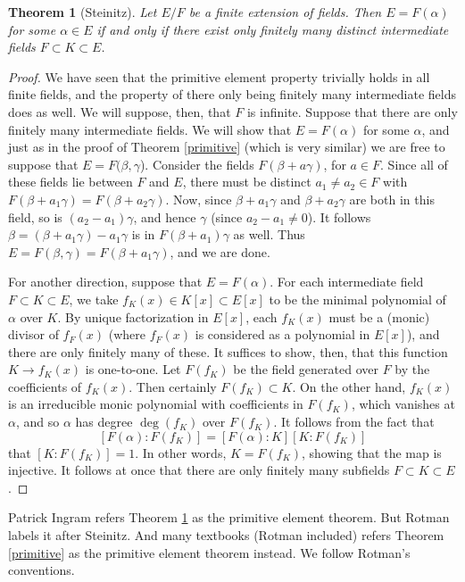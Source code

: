 \documentclass[12pt]{report}
\newtheorem{theorem}{Theorem}[section]
\theoremstyle{definition}
\begin{document}
\begin{theorem}[Steinitz]\label{ste}
	Let $E/F$ be a finite extension of fields. Then $E = F(\alpha)$ for some $\alpha \in E$ if and only if there exist only finitely many distinct intermediate fields $F \subset K \subset E$.
\end{theorem}

\begin{proof}
	We have seen that the primitive element property trivially holds in all finite fields, and the property of there only being finitely many intermediate fields does as well. We will suppose, then, that $F$ is infinite.
	Suppose that there are only finitely many intermediate fields. We will show that $E = F(\alpha)$ for some $\alpha$, and just as in the proof of Theorem \ref{primitive} (which is very similar) we are free to suppose that $E = F(\beta,\gamma$). Consider the fields $F(\beta + a\gamma)$, for $a \in F$. Since all of these fields lie between $F$ and $E$, there must be distinct $a_1 \not= a_2 \in F$ with $F(\beta + a_1 \gamma) = F(\beta + a_2\gamma)$. Now, since $\beta + a_1 \gamma$ and $\beta + a_2 \gamma$ are both in this field, so is $(a_2 - a_1)\gamma$, and hence $\gamma$ (since $a_2 - a_1 \not= 0$). It follows $\beta = (\beta+a_1\gamma) -a_1\gamma$ is in $F(\beta +a_1)\gamma$ as well. Thus $E = F(\beta,\gamma) = F(\beta + a_1\gamma)$, and we are done.

	For another direction, suppose that $E = F(\alpha)$. For each intermediate field $F \subset K \subset E$, we take $f_K(x) \in K[x] \subset E[x]$ to be the minimal polynomial of $\alpha$ over $K$. By unique factorization in $E[x]$, each $f_K(x)$ must be a (monic) divisor of $f_F(x)$ (where $f_F(x)$ is considered as a polynomial in $E[x]$), and there are only finitely many of these. It suffices to show, then, that this function $K \to f_K(x)$ is one-to-one. Let $F(f_K)$ be the field generated over $F$ by the coefficients of $f_K(x)$. Then certainly $F(f_K) \subset K$. On the other hand, $f_K(x)$ is an irreducible monic polynomial with coefficients in $F(f_K)$, which vanishes at $\alpha$, and so $\alpha$ has degree $\deg(f_K)$ over $F(f_K)$. It follows from the fact that
	$$[F(\alpha):F(f_K)] = [F(\alpha):K][K:F(f_K)]$$ that $[K : F(f_K)] = 1$. In other words, $K = F(f_K)$, showing that the map is injective. It follows at once that there are only finitely many subfields $F \subset K \subset E$.
\end{proof}

\begin{remark}
	Patrick Ingram refers Theorem \ref{ste} as the primitive element theorem. But Rotman labels it after Steinitz. And many textbooks (Rotman included) refers Theorem \ref{primitive} as the primitive element theorem instead. We follow Rotman's conventions.
\end{remark}
\end{document}
